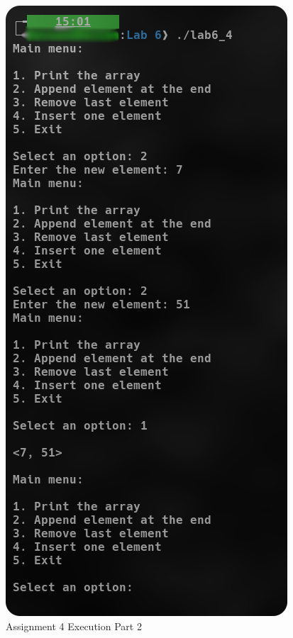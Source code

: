 \documentclass[
	letterpaper, %
	10pt, %
]{CSUniSchoolLabReport}
\begin{document}
  \begin{figure}[H]
    \centering
    \includegraphics[height=.9\textheight]{Figures/6_4-2.png}
    \caption{Assignment 4 Execution Part 2}
    \label{fig:7}
  \end{figure}
\end{document}
